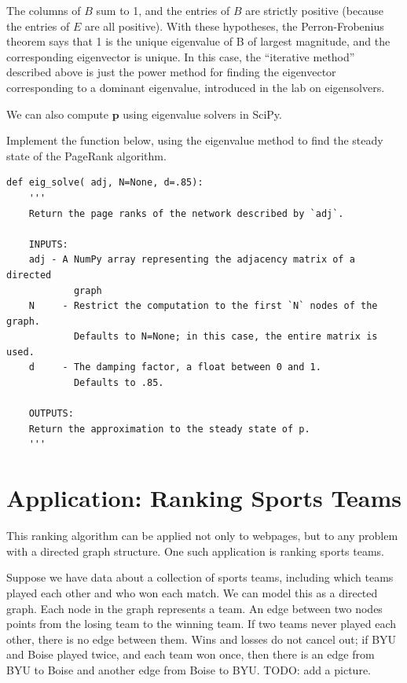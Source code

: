 The columns of $B$ sum to 1, and the entries of $B$ are strictly positive (because the entries of $E$ are all positive).
With these hypotheses, the Perron-Frobenius theorem says that 1 is the unique eigenvalue of B of largest magnitude, and the corresponding eigenvector is unique.
In this case, the ``iterative method'' described above is just the power method for finding the eigenvector corresponding to a dominant eigenvalue, introduced in the lab on eigensolvers. %

We can also compute $\mathbf{p}$ using eigenvalue solvers in SciPy.

\begin{problem}
Implement the function below, using the eigenvalue method to find the steady state of the PageRank algorithm.
\begin{lstlisting}
def eig_solve( adj, N=None, d=.85):
    '''
    Return the page ranks of the network described by `adj`.

    INPUTS:
    adj - A NumPy array representing the adjacency matrix of a directed
            graph
    N     - Restrict the computation to the first `N` nodes of the graph.
            Defaults to N=None; in this case, the entire matrix is used.
    d     - The damping factor, a float between 0 and 1.
            Defaults to .85.

    OUTPUTS:
    Return the approximation to the steady state of p.
    '''
\end{lstlisting}
\end{problem}

\section*{Application: Ranking Sports Teams}
This ranking algorithm can be applied not only to webpages, but to any problem with a directed graph structure.
One such application is ranking sports teams.

Suppose we have data about a collection of sports teams, including which teams played each other and who won each match.
We can model this as a directed graph. Each node in the graph represents a team.
An edge between two nodes points from the losing team to the winning team.
If two teams never played each other, there is no edge between them.
Wins and losses do not cancel out; if BYU and Boise played twice, and each team won once, then there is an edge from BYU to Boise and another edge from Boise to BYU. TODO: add a picture.

